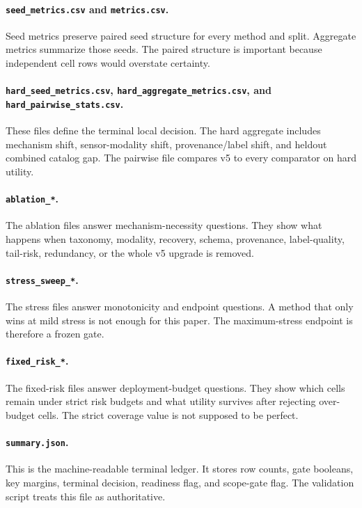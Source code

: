 \documentclass{article}
\begin{document}
\paragraph{\texttt{seed\_metrics.csv} and \texttt{metrics.csv}.}
Seed metrics preserve paired seed structure for every method and split. Aggregate metrics summarize those seeds. The paired structure is important because independent cell rows would overstate certainty.

\paragraph{\texttt{hard\_seed\_metrics.csv}, \texttt{hard\_aggregate\_metrics.csv}, and \texttt{hard\_pairwise\_stats.csv}.}
These files define the terminal local decision. The hard aggregate includes mechanism shift, sensor-modality shift, provenance/label shift, and heldout combined catalog gap. The pairwise file compares v5 to every comparator on hard utility.

\paragraph{\texttt{ablation\_*}.}
The ablation files answer mechanism-necessity questions. They show what happens when taxonomy, modality, recovery, schema, provenance, label-quality, tail-risk, redundancy, or the whole v5 upgrade is removed.

\paragraph{\texttt{stress\_sweep\_*}.}
The stress files answer monotonicity and endpoint questions. A method that only wins at mild stress is not enough for this paper. The maximum-stress endpoint is therefore a frozen gate.

\paragraph{\texttt{fixed\_risk\_*}.}
The fixed-risk files answer deployment-budget questions. They show which cells remain under strict risk budgets and what utility survives after rejecting over-budget cells. The strict coverage value is not supposed to be perfect.

\paragraph{\texttt{summary.json}.}
This is the machine-readable terminal ledger. It stores row counts, gate booleans, key margins, terminal decision, readiness flag, and scope-gate flag. The validation script treats this file as authoritative.
\end{document}
